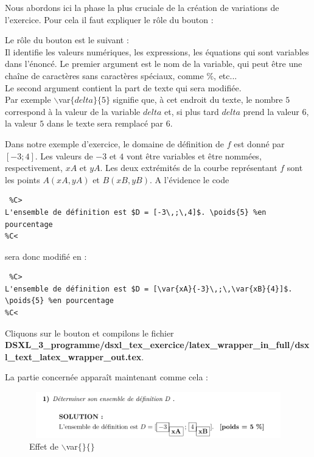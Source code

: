 {Nous abordons ici la phase la plus cruciale de la création de variations de l'exercice. Pour cela il faut expliquer le rôle du bouton   :

\begin{dsxl}
 Le rôle du bouton   est le suivant : \\
Il identifie les valeurs numériques, les expressions, les équations qui sont variables dans l'énoncé. Le premier argument est le nom de la variable, 
  qui peut être une chaîne de caractères sans caractères spéciaux, comme $\%$, etc... \\
  Le second argument contient la part de texte qui sera modifiée. \\
  Par exemple $\backslash$var$\{delta\}\{5\}$ signifie que, à cet endroit du texte, le nombre $5$ correspond à la valeur de la variable $delta$ et, si plus tard $delta$ prend la valeur $6$,
  la valeur $5$ dans le texte sera remplacé par $6$. 

\end{dsxl}

Dans notre exemple d'exercice, le domaine de définition de $f$ est donné par $[-3 ; 4]$. Les valeurs de $-3$ et $4$ vont être variables et être nommées, respectivement, $xA$ et $yA$. 
Les deux extrémités de la courbe représentant $f$ sont les points $A(xA,yA)$ et $B(xB,yB)$. 
A l'évidence le code
\begin{verbatim}
 %C>
L'ensemble de définition est $D = [-3\,;\,4]$. \poids{5} %en pourcentage
%C<
\end{verbatim}
sera donc modifié en :
\begin{verbatim}
 %C>
L'ensemble de définition est $D = [\var{xA}{-3}\,;\,\var{xB}{4}]$. \poids{5} %en pourcentage
%C<
\end{verbatim}

Cliquons sur le bouton   et compilons le fichier \\
{\bf DSXL\_3\_programme/dsxl\_tex\_exercice/latex\_wrapper\_in\_full/dsxl\_text\_latex\_wrapper\_out.tex}.

La partie concernée apparaît maintenant comme cela : 
\begin{figure}[h]
 \centering
 \includegraphics[width=12cm,height=2cm]{./images/creation_exercice_var_01.png}
 \caption{Effet de $\backslash$var$\{\}\{\}$}
 \label{fig: var 01}
\end{figure}

}
